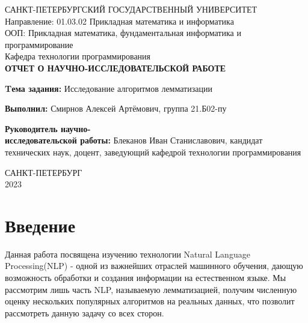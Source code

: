 \documentclass[12pt, a4paper]{article}
\begin{document}
\pagestyle{fancy}
\fancyhf{}
\renewcommand{\headrulewidth}{0pt}

\begin{center}
САНКТ-ПЕТЕРБУРГСКИЙ ГОСУДАРСТВЕННЫЙ УНИВЕРСИТЕТ\\
Направление: 01.03.02 Прикладная математика и информатика \\
ООП: Прикладная математика, фундаментальная информатика и программирование \\
Кафедра технологии программирования \\

\vspace*{2cm}
\large \textbf{ОТЧЕТ О НАУЧНО-ИССЛЕДОВАТЕЛЬСКОЙ РАБОТЕ}
\end{center}
\vspace*{2cm}

\hspace*{0.5cm}
\textbf{Tема задания:} Исследование алгоритмов лемматизации
\vspace*{1cm}

\hspace*{0.5cm}
\textbf{Выполнил:} Смирнов Алексей Артёмович, группа 21.Б02-пу 
\vspace*{1cm}

\hspace*{0.5cm}
\textbf{Руководитель научно- \\
\hspace*{1cm} исследовательской работы:} Блеканов Иван Станиславович, кандидат \\ \hspace*{1cm} технических наук, доцент, заведующий кафедрой технологии программирования
 
 
\vspace*{10cm}
\begin{center}
САНКТ-ПЕТЕРБУРГ \\
2023
\end{center}

\newpage

\renewcommand{\contentsname}{\begin{center}Содержание\end{center}}
\tableofcontents

\newpage

\fancyfoot[C]{\thepage}

\section{Введение}
\quad Данная работа посвящена изучению технологии Natural Language Processing(NLP) - одной из важнейших отраслей машинного обучения, дающую возможность обработки и создания информации на естественном языке. Мы рассмотрим лишь часть NLP, называемую лемматизацией, получим численную оценку нескольких популярных алгоритмов на реальных данных, что позволит рассмотреть данную задачу со всех сторон.
\end{document}
